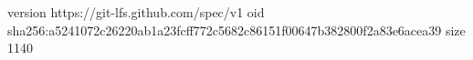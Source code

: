 version https://git-lfs.github.com/spec/v1
oid sha256:a5241072c26220ab1a23fcff772c5682c86151f00647b382800f2a83e6acea39
size 1140
